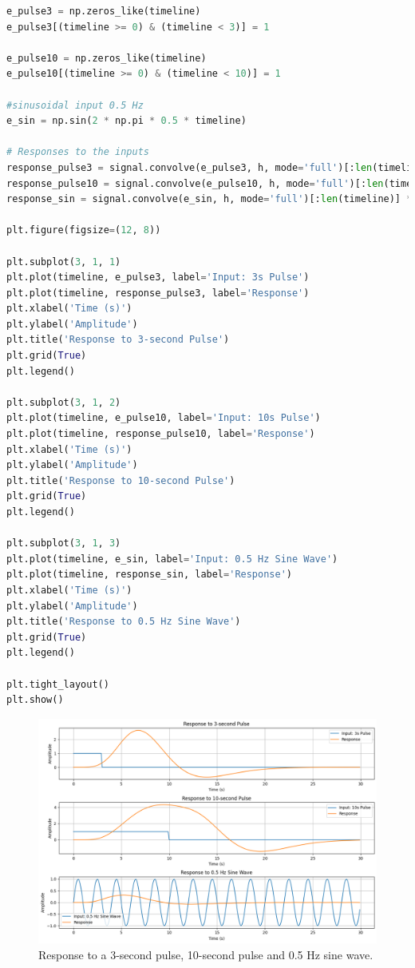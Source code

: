 \documentclass[10pt]{article}
\theoremstyle{definition}
\theoremstyle{remark}
\theoremstyle{definition}
\numberwithin{equation}{prob}
\begin{document}
\begin{lstlisting}[language=Python]
e_pulse3 = np.zeros_like(timeline)
e_pulse3[(timeline >= 0) & (timeline < 3)] = 1

e_pulse10 = np.zeros_like(timeline)
e_pulse10[(timeline >= 0) & (timeline < 10)] = 1

#sinusoidal input 0.5 Hz
e_sin = np.sin(2 * np.pi * 0.5 * timeline)

# Responses to the inputs
response_pulse3 = signal.convolve(e_pulse3, h, mode='full')[:len(timeline)] * TR
response_pulse10 = signal.convolve(e_pulse10, h, mode='full')[:len(timeline)] * TR
response_sin = signal.convolve(e_sin, h, mode='full')[:len(timeline)] * TR

plt.figure(figsize=(12, 8))

plt.subplot(3, 1, 1)
plt.plot(timeline, e_pulse3, label='Input: 3s Pulse')
plt.plot(timeline, response_pulse3, label='Response')
plt.xlabel('Time (s)')
plt.ylabel('Amplitude')
plt.title('Response to 3-second Pulse')
plt.grid(True)
plt.legend()

plt.subplot(3, 1, 2)
plt.plot(timeline, e_pulse10, label='Input: 10s Pulse')
plt.plot(timeline, response_pulse10, label='Response')
plt.xlabel('Time (s)')
plt.ylabel('Amplitude')
plt.title('Response to 10-second Pulse')
plt.grid(True)
plt.legend()

plt.subplot(3, 1, 3)
plt.plot(timeline, e_sin, label='Input: 0.5 Hz Sine Wave')
plt.plot(timeline, response_sin, label='Response')
plt.xlabel('Time (s)')
plt.ylabel('Amplitude')
plt.title('Response to 0.5 Hz Sine Wave')
plt.grid(True)
plt.legend()

plt.tight_layout()
plt.show()
\end{lstlisting}

\begin{figure}[H]
    \centering
    \includegraphics[width=0.8\linewidth]{./figures/Hemodynamic Response Function Response.png}
    \caption{Response to a 3-second pulse, 10-second pulse and 0.5 Hz sine wave.}
\end{figure}
\end{document}
